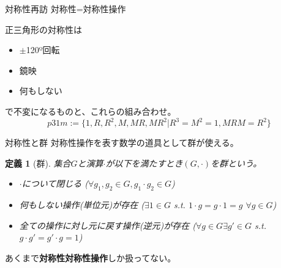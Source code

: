 \documentclass[dvipdfm]{beamer}
\newtheorem*{defn}{定義}
\begin{document}
\begin{frame}{対称性再訪}
    対称性=対称性操作
    \begin{figure}
        \centering
        \begin{minipage}{0.45\linewidth}
            \centering
        \end{minipage}
        \begin{minipage}{0.45\linewidth}
            \centering
        \end{minipage}
    \end{figure}
    正三角形の対称性は
    \begin{itemize}
        \item $\pm$120º回転
        \item 鏡映
        \item 何もしない
    \end{itemize}
    で不変になるものと、これらの組み合わせ。
    \begin{equation*}
        p31m:=\{1, R, R^2, M, MR, MR^2 | R^3=M^2=1, MRM=R^2\}
    \end{equation*}
\end{frame}

\begin{frame}{対称性と群}
    対称性操作を表す数学の道具として群が使える。
    \begin{defn}[群]
        集合$G$と演算$\cdot$が以下を満たすとき$(G,\cdot)$を群という。
        \begin{itemize}
            \item $\cdot$について閉じる ($\forall g_1,g_2\in G, g_1\cdot g_2\in G$)
            \item 何もしない操作(単位元)が存在 ($\exists 1\in G$ s.t. $1\cdot g=g\cdot1=g$ $\forall g\in G$)
            \item 全ての操作に対し元に戻す操作(逆元)が存在 ($\forall g\in G\exists g'\in G$ s.t. $g\cdot g'=g'\cdot g=1$)
        \end{itemize}
    \end{defn}
    あくまで\textbf{対称性対称性操作}しか扱ってない。
\end{frame}
\end{document}
